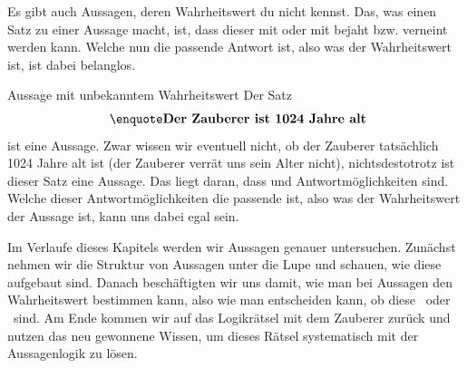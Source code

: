 \documentclass[../../main.tex]{subfiles}
\begin{document}
    Es gibt auch Aussagen, deren Wahrheitswert du nicht kennst. 
    Das, was einen Satz zu einer Aussage macht, 
    ist, dass dieser mit   oder 
    mit   bejaht bzw. verneint werden kann. 
    Welche nun die passende Antwort ist, also was der Wahrheitswert ist, ist dabei belanglos.
   
   \begin{example}{Aussage mit unbekanntem Wahrheitswert}
        Der Satz 
        \[\textrm{ \statement{Der Zauberer ist 1024 Jahre alt}}\]
        ist eine Aussage. Zwar wissen wir eventuell nicht, ob der Zauberer tatsächlich 1024 
        Jahre alt ist (der Zauberer verrät uns sein Alter nicht), nichtsdestotrotz ist 
        dieser Satz eine Aussage. Das liegt daran, dass 
          und    
        Antwortmöglichkeiten sind. Welche dieser Antwortmöglichkeiten die passende ist, also 
        was der Wahrheitswert der Aussage ist, kann uns dabei egal sein.
   \end{example}

    Im Verlaufe dieses Kapitels werden wir Aussagen genauer untersuchen. Zunächst 
    nehmen wir die Struktur von Aussagen unter die Lupe und schauen, wie 
    diese aufgebaut sind. Danach beschäftigten wir uns damit, 
    wie man bei Aussagen den Wahrheitswert bestimmen kann, 
    also wie man entscheiden kann, ob diese \wahr\  oder \falsch\  sind. Am Ende 
    kommen wir auf das Logikrätsel mit dem Zauberer zurück und nutzen das neu 
    gewonnene Wissen, um dieses Rätsel systematisch mit der Aussagenlogik zu lösen.

    
        
\end{document}
